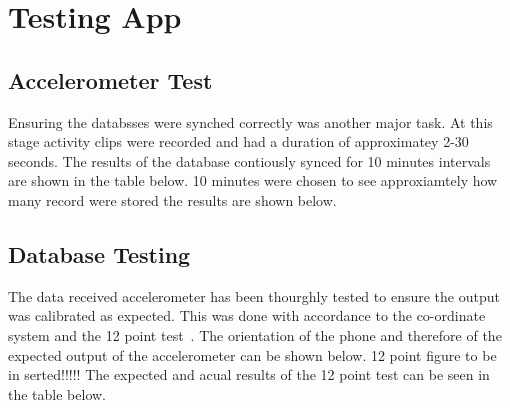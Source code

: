 \chapter{Testing App} %
\label{cha:chapter_apptest}



\section{Accelerometer Test} %
\label{sec:section_acctesting}
Ensuring the databsses were synched correctly was another major task. At this stage activity clips were recorded and had a duration of approximatey 2-30 seconds. The results of the database contiously synced for 10 minutes intervals are shown in the table below. 10 minutes were chosen to see approxiamtely how many record were stored the results are shown below. 




\section{Database Testing} %
\label{sec:db_testing}
The data received accelerometer has been thourghly tested to ensure the output was calibrated as expected. This was done with accordance to the co-ordinate system and the 12 point test~\cite{hung1989calibration}. The orientation of the phone and therefore of the expected output of the accelerometer can be shown below. 12 point figure to be in serted!!!!! The expected and acual results of the 12 point test can be seen in the table below. 
